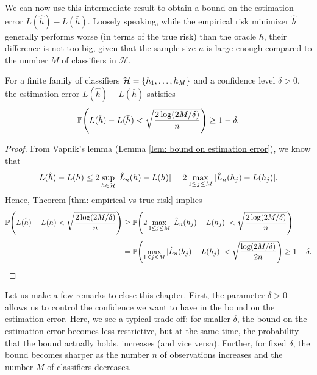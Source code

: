 We can now use this intermediate result to obtain a bound on the estimation error $L(\hat{h}) - L(\bar{h})$. Loosely speaking, while the empirical risk minimizer $\hat{h}$ generally performs worse (in terms of the true risk) than the oracle $\bar{h}$, their difference is not too big, given that the sample size $n$ is large enough compared to the number $M$ of classifiers in $\mathcal{H}$.

\begin{theorem}
\label{thm: estimation error finite dictionary}
For a finite family of classifiers $\mathcal{H} = \set{h_1, \dots, h_M}$ and a confidence level $\delta > 0$, the estimation error $L(\hat{h}) - L(\bar{h})$ satisfies
\[
    \P\left(L(\hat{h}) - L(\bar{h}) < \sqrt{\frac{2 \log(2M / \delta)}{n}}\right) \geq 1 - \delta.
\]
\end{theorem}

\begin{proof}
From Vapnik's lemma (Lemma \ref{lem: bound on estimation error}), we know that
\[
    L(\hat{h}) - L(\bar{h}) \leq 2 \sup_{h \in \mathcal{H}} \abs*{\hat{L}_n(h) - L(h)} = 2 \max_{1 \leq j \leq M} \abs*{\hat{L}_n(h_j) - L(h_j)}.
\]
Hence, Theorem \ref{thm: empirical vs true risk} implies
\begin{align*}
    \P\left(L(\hat{h}) - L(\bar{h}) < \sqrt{\frac{2 \log(2M / \delta)}{n}}\right) &\geq \P\left(2 \max_{1 \leq j \leq M} \abs*{\hat{L}_n(h_j) - L(h_j)} < \sqrt{\frac{2 \log(2M / \delta)}{n}}\right) \\[4pt]
    &= \P\left(\max_{1 \leq j \leq M} \abs*{\hat{L}_n(h_j) - L(h_j)} < \sqrt{\frac{\log(2M / \delta)}{2n}}\right) \geq 1 - \delta. \qedhere
\end{align*}
\end{proof}

Let us make a few remarks to close this chapter. First, the parameter $\delta > 0$ allows us to control the confidence we want to have in the bound on the estimation error. Here, we see a typical trade-off: for smaller $\delta$, the bound on the estimation error becomes less restrictive, but at the same time, the probability that the bound actually holds, increases (and vice versa). Further, for fixed $\delta$, the bound becomes sharper as the number $n$ of observations increases and the number $M$ of classifiers decreases.
